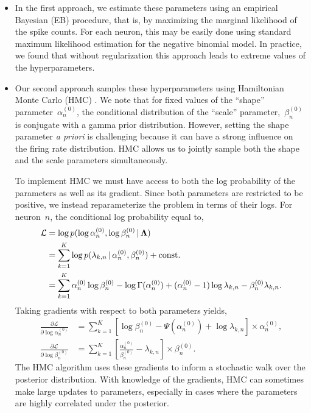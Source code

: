 \begin{itemize}

\item In the first approach, we estimate these parameters using an
  empirical Bayesian (EB) procedure, that is, by maximizing the
  marginal likelihood of the spike counts.  For each neuron, this may be
  easily done using standard maximum likelihood estimation for the
  negative binomial model.  In practice, we found that without
  regularization this approach leads to extreme values of the
  hyperparameters.

 

\item Our second approach samples these hyperparameters using
  Hamiltonian Monte Carlo (HMC) \citep{Neal10}. We note that for fixed
  values of the ``shape'' parameter~$\alpha_n^{(0)}$, the conditional
  distribution of the ``scale'' parameter,~$\beta_n^{(0)}$ is conjugate
  with a gamma prior distribution. However, setting the shape
  parameter \textit{a priori} is challenging because it can have a
  strong influence on the firing rate distribution. HMC allows us to
  jointly sample both the shape and the scale parameters
  simultaneously.

To implement HMC we must have access to both the log probability of
the parameters as well as its gradient. Since both parameters are
restricted to be positive, we instead reparameterize the problem in
terms of their logs. For neuron~$n$, the conditional log probability
equal to,
\begin{align*}
\mathcal{L} 
  &= \log p(\log \alpha_n^{(0)}, \log \beta_n^{(0)} \,|\, \boldsymbol{\Lambda}) \\
  &= \sum_{k=1}^K \log p(\lambda_{k,n} \,|\, \alpha_n^{(0)}, \beta_n^{(0)}) + \text{const.} \\
  &= \sum_{k=1}^K \alpha_n^{(0)} \log \beta_n^{(0)} - \log \Gamma(\alpha_n^{(0)}) + (\alpha_n^{(0)} - 1) \log \lambda_{k,n} - \beta_n^{(0)} \lambda_{k,n}.
\end{align*}
Taking gradients with respect to both parameters yields,
\begin{align*}
  \frac{\partial \mathcal{L}}{\partial \log \alpha_n^{(0)}} 
  &= \sum_{k=1}^K \left[ \log \beta_n^{(0)} -\Psi(\alpha_n^{(0)}) + \log \lambda_{k,n} \right] \times \alpha_n^{(0)}, \\
  \frac{\partial \mathcal{L}}{\partial \log \beta_n^{(0)}} 
  &= \sum_{k=1}^K \left[ \frac{\alpha_n^{(0)}}{\beta_n^{(0)}}  - \lambda_{k,n} \right] \times \beta_n^{(0)}.
\end{align*}
The HMC algorithm uses these gradients to inform a stochastic walk
over the posterior distribution. With knowledge of the gradients, HMC
can sometimes make large updates to parameters, especially in cases
where the parameters are highly correlated under the posterior.



\end{itemize}
